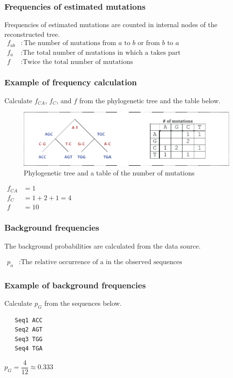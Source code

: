 %
%
\subsubsection*{Frequencies of estimated mutations}
Frequencies of estimated mutations are counted in internal nodes of the reconstructed tree. \\

$\begin{aligned}
f_{ab} &: \text{The number of mutations from } a \text{ to } b \text{ or from } b \text{ to } a \\
f_{a} &: \text{The total number of mutations in which a takes part} \\
f & : \text{Twice the total number of mutations}
\end{aligned} $

%
%
\subsubsection*{Example of frequency calculation}
Calculate $f_{CA}$, $f_{C}$, and $f$ from the phylogenetic tree and the table below.

\begin{figure}[H]
  \centering
      \includegraphics[width=0.75 \textwidth]{fig11/scoring_mat_frequency_example.png}
  \caption{Phylogenetic tree and a table of the number of mutations}
\end{figure}

$\begin{aligned}
f_{CA} &=1 \\
f_{C} &= 1 + 2 + 1 = 4\\
f &= 10
\end{aligned} $

%
%
\subsubsection*{Background frequencies}
The background probabilities are calculated from the data source. 

$\begin{aligned}
p_a &: \text{The relative occurrence of a in the observed sequences} 
\end{aligned} $

%
%
\subsubsection*{Example of background frequencies}
Calculate $p_G$ from the sequences below.

\begin{verbatim}
   Seq1 ACC
   Seq2 AGT
   Seq3 TGG
   Seq4 TGA
\end{verbatim}

$p_G = \dfrac{4}{12} \approx 0.333$

\bigskip 

%
